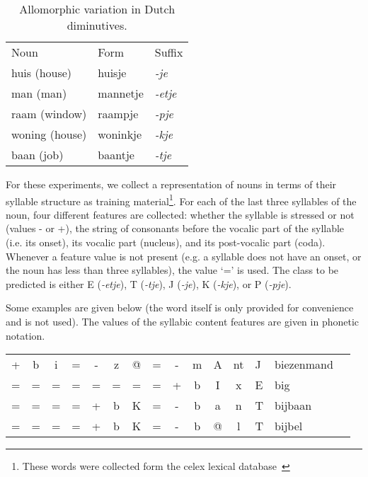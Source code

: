 \documentclass{report}
\begin{document}
\begin{table}[ht]
\begin{center}
\begin{tabular}{l|l|l}
Noun & Form & Suffix \\
\noalign{\smallskip}
\hline
\noalign{\smallskip}
huis (house) & huisje & {\em -je} \\
man (man) & mannetje & {\em -etje\/} \\
raam (window) & raampje & {\em -pje\/} \\
woning (house) & woninkje & {\em -kje\/} \\
baan (job) & baantje & {\em -tje\/} \\
\end{tabular}
\caption{Allomorphic variation in Dutch diminutives.}\label{variation}
\end{center}
\end{table}

For these experiments, we collect a representation of nouns in terms
of their syllable structure as training material\footnote{These words
  were collected form the {\sc celex} lexical
  database~\cite{Baayen+93}}. For each of the last three syllables of
the noun, four different features are collected: whether the syllable
is stressed or not (values - or +), the string of consonants before
the vocalic part of the syllable (i.e. its onset), its vocalic part
(nucleus), and its post-vocalic part (coda). Whenever a feature value
is not present (e.g. a syllable does not have an onset, or the noun
has less than three syllables), the value `=' is used. The class to be
predicted is either E ({\em -etje}), T ({\em -tje}), J ({\em -je}), K
({\em -kje}), or P ({\em -pje}).

Some examples are given below (the word itself is only provided for
convenience and is not used). The values of the syllabic content
features are given in phonetic notation.

\begin{table}[ht]
\begin{center}
\begin{tabular}{cccccccccccc|l|l|l}
+ & b & i & = & - & z & @ & = & - & m & A & nt & J & biezenmand \\
= & = & = & = & = & = & = & = & + & b & I & x & E & big\\
= & = & = & = & + & b & K & = & - & b & a & n & T & bijbaan\\
= & = & = & = & + & b & K & = & - & b & @ & l & T & bijbel\\
\end{tabular}
\end{center}
\end{table}
\end{document}
